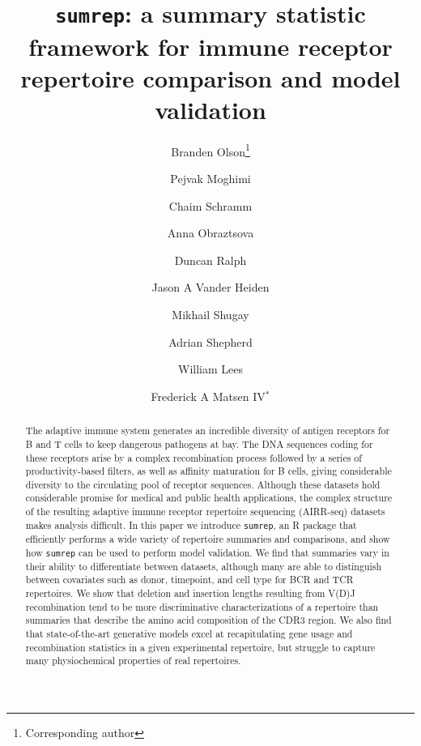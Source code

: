 \documentclass{article}
\begin{document}
\title{\texttt{sumrep}: a summary statistic framework for immune receptor repertoire comparison and model validation}
\author[1, 2]{Branden Olson\thanks{Corresponding author}}
\author[3]{Pejvak Moghimi}
\author[4]{Chaim Schramm}
\author[5,7]{Anna Obraztsova}
\author[1]{Duncan Ralph}
\author[6]{Jason A Vander Heiden}
\author[5,7,8]{Mikhail Shugay}
\author[3]{Adrian Shepherd}
\author[3]{William Lees}
\author[1]{Frederick A Matsen IV$^*$}

\maketitle

\begin{abstract}
The adaptive immune system generates an incredible diversity of antigen receptors for B and T cells to keep dangerous pathogens at bay.
The DNA sequences coding for these receptors arise by a complex recombination process followed by a series of productivity-based filters, as well as affinity maturation for B cells, giving considerable diversity to the circulating pool of receptor sequences.
Although these datasets hold considerable promise for medical and public health applications, the complex structure of the resulting adaptive immune receptor repertoire sequencing (AIRR-seq) datasets makes analysis difficult.
In this paper we introduce \texttt{sumrep}, an R package that efficiently performs a wide variety of repertoire summaries and comparisons, and show how \texttt{sumrep} can be used to perform model validation.
We find that summaries vary in their ability to differentiate between datasets, although many are able to distinguish between covariates such as donor, timepoint, and cell type for BCR and TCR repertoires.
We show that deletion and insertion lengths resulting from V(D)J recombination tend to be more discriminative characterizations of a repertoire than summaries that describe the amino acid composition of the CDR3 region.
We also find that state-of-the-art generative models excel at recapitulating gene usage and recombination statistics in a given experimental repertoire, but struggle to capture many physiochemical properties of real repertoires.
\end{abstract}
\end{document}
